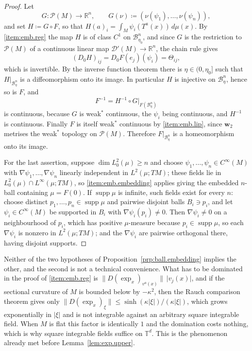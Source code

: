 \documentclass[11pt,reqno]{amsart}
\theoremstyle{plain}
\theoremstyle{definition}
\newcommand{\dw}{\mathbf{w}_2}
\newcommand{\T}{\mathbb{T}}
\newcommand{\R}{\mathbb{R}}
\newcommand{\lto}{\longrightarrow}
\newcommand{\Prob}{\mathcal{P}}
\newcommand{\Dist}{\mathcal{D}'}
\begin{document}
\begin{proof}
    Let
    \[
        G:\Prob(M)\lto\R^n,\qquad G(\nu)\coloneqq\left(\nu(\psi_1),\dots,\nu(\psi_n)\right),
    \]
    and set \( H\coloneqq G\circ F \), so that \( H(a)_i=\int_M\psi_i\left(T^a(x)\right)\,d\mu(x) \).
    By \ref{item:emb.reg} the map \( H \) is of class \( C^1 \) on \( \mathcal B^n_{\eta_0} \), and since \( G \) is the restriction to \( \Prob(M) \) of a continuous linear map \( \Dist(M)\to\R^n \), the chain rule gives
    \[
        (D_0H)_{ij}=D_0F(e_j)(\psi_i)=\Theta_{ij} ,
    \]
    which is invertible.
    By the inverse function theorem there is \( \eta\in(0,\eta_0] \) such that \( H|_{\mathcal B^n_\eta} \) is a diffeomorphism onto its image.
    In particular \( H \) is injective on \( \mathcal B^n_\eta \), hence so is \( F \), and
    \[
        F^{-1}=H^{-1}\circ G|_{F(\mathcal B^n_\eta)}
    \]
    is continuous, because \( G \) is weak\( ^\ast \) continuous, the \( \psi_i \) being continuous, and \( H^{-1} \) is continuous.
    Finally \( F \) is itself weak\( ^\ast \) continuous by \ref{item:emb.lip}, since \( \dw \) metrises the weak\( ^\ast \) topology on \( \Prob(M) \).
    Therefore \( F|_{\mathcal B^n_\eta} \) is a homeomorphism onto its image.

    For the last assertion, suppose \( \dim L^2_0(\mu)\ge n \) and choose \( \psi_1,\dots,\psi_n\in C^\infty(M) \) with \( \nabla\psi_1,\dots,\nabla\psi_n \) linearly independent in \( L^2(\mu;TM) \); these fields lie in \( L^2_0(\mu)\cap L^\infty(\mu;TM) \), so \ref{item:emb.embedding} applies giving the embedded \( n \)-ball containing \( \mu=F(0) \).
    If \( \operatorname{supp}\mu \) is infinite, such fields exist for every \( n \): choose distinct \( p_1,\dots,p_n\in\operatorname{supp}\mu \) and pairwise disjoint balls \( B_i\ni p_i \), and let \( \psi_i\in C^\infty(M) \) be supported in \( B_i \) with \( \nabla\psi_i(p_i)\neq0 \).
    Then \( \nabla\psi_i\neq0 \) on a neighbourhood of \( p_i \), which has positive \( \mu \)-measure because \( p_i\in\operatorname{supp}\mu \), so each \( \nabla\psi_i \) is nonzero in \( L^2(\mu;TM) \); and the \( \nabla\psi_i \) are pairwise orthogonal there, having disjoint supports.
\end{proof}


Neither of the two hypotheses of Proposition~\ref{prp:ball.embedding} implies the other, and the second is not a technical convenience.
What has to be dominated in the proof of \ref{item:emb.reg} is \( \lVert D(\exp_x)_{v^a(x)}\rVert\,\lvert v_j(x)\rvert \), and if the sectional curvature of \( M \) is bounded below by \( -\kappa^2 \), then the Rauch comparison theorem \cite{cheeger_comparison_1975} gives only \( \lVert D(\exp_x)_\xi\rVert\le\sinh(\kappa\lvert\xi\rvert)/(\kappa\lvert\xi\rvert) \), which grows exponentially in \( \lvert\xi\rvert \) and is not integrable against an arbitrary square integrable field.
When \( M \) is flat this factor is identically \( 1 \) and the domination costs nothing, which is why square integrable fields suffice on \( \T^d \).
This is the phenomenon already met before Lemma~\ref{lem:exp.upper}.
\end{document}
